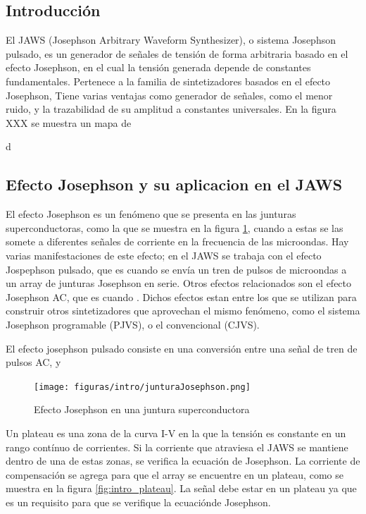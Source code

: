 \documentclass[twoside]{article}
\begin{document}
\begin{multicols}{2}

\section{Introducción}

El JAWS (Josephson Arbitrary Waveform Synthesizer), o sistema Josephson pulsado, es un generador de señales de tensión de forma arbitraria basado en el efecto Josephson, en el cual la tensión generada depende de constantes fundamentales. Pertenece a la familia de sintetizadores basados en el efecto Josephson, 
Tiene varias ventajas como generador de señales, como el menor ruido, y la trazabilidad de su amplitud a constantes universales. En la figura XXX se muestra un mapa de 

d

    \subsection{Efecto Josephson y su aplicacion en el JAWS}

    El efecto Josephson es un fenómeno que se presenta en las junturas superconductoras, como la que se muestra en la figura \ref{fig:intro_junturaJosephson}, cuando a estas se las somete a diferentes señales de corriente en la frecuencia de las microondas. Hay varias manifestaciones de este efecto; en el JAWS se trabaja con el efecto Jospephson pulsado, que es cuando se envía un tren de pulsos de microondas a un array de junturas Josephson en serie. Otros efectos relacionados son el efecto Josephson AC, que es cuando . Dichos efectos estan entre los que se utilizan para construir otros sintetizadores que aprovechan el mismo fenómeno, como el sistema Josephson programable (PJVS), o el convencional (CJVS). 

    El efecto josephson pulsado consiste en una conversión entre una señal de tren de pulsos AC,  y 



\begin{figure}[H]
    \centering
    \texttt{[image: figuras/intro/junturaJosephson.png]}
    \caption{Efecto Josephson en una juntura superconductora}
    \label{fig:intro_junturaJosephson}
\end{figure}



Un plateau es una zona de la curva I-V en la que la tensión es constante en un rango contínuo de corrientes. Si la corriente que atraviesa el JAWS se mantiene dentro de una de estas zonas, se verifica la ecuación de Josephson.
La corriente de compensación se agrega para que el array se encuentre en un plateau, como se muestra en la figura \ref{fig:intro_plateau}. La señal debe estar en un plateau ya que es un requisito para que se verifique la ecuaciónde Josephson.


\end{multicols}
\end{document}
